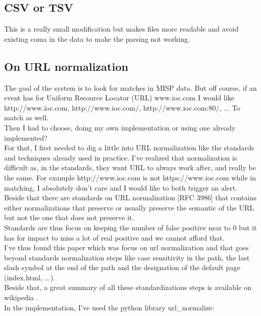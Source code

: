 \documentclass{eplmastersthesis}
\begin{document}
\subsection{CSV or TSV}
This is a really small modification but makes files more readable and avoid existing coma in the data to make the parsing not working.

\subsection{On URL normalization}
The goal of the system is to look for matches in MISP data. But off course, if an event has for Uniform Resource Locator (URL) www.ioc.com I would like http://www.ioc.com, http://www.ioc.com/, http://www.ioc.com:80/, ... To match as well.\\
Then I had to choose, doing my own implementation or using one already implemented?\\
For that, I first needed to dig a little into URL normalization like the standards and techniques already used in practice. I've realized that normalization is difficult as, in the standards, they want URL to always work after, and really be the same. For example http://www.ioc.com is not https://www.ioc.com while in matching, I absolutely don't care and I would like to both trigger an alert.\\
Beside that there are standards on URL normalization [RFC 3986] that contains either normalizations that preserve or usually preserve the semantic of the URL but not the one that does not preserve it.\\
Standards are thus focus on keeping the number of false positive near to 0 but it has for impact to miss a lot of real positive and we cannot afford that.\\
I've thus found this paper \cite{lee2005url} which was focus on url normalization and that goes beyond standards normalization steps like case sensitivity in the path, the last slash symbol at the end of the path and the designation of the default page (index.html, ...).\\
Beside that, a great summary of all these standardizations steps is available on wikipedia \cite{wikiNormalizationURL}.\\
In the implementation, I've used the python library url\_normalize:
\end{document}
